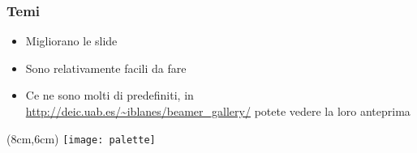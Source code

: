 \begin{frame}
 
 \frametitle{Temi}
 
 \begin{itemize}
  \item Migliorano le slide
  \item Sono relativamente facili da fare
  \item Ce ne sono molti di predefiniti, in 
\url{http://deic.uab.es/~iblanes/beamer_gallery/} potete vedere la loro 
anteprima
 \end{itemize}
 
 \begin{textblock*}{5cm}(8cm,6cm)
    \texttt{[image: palette]}
  \end{textblock*}

\end{frame}
